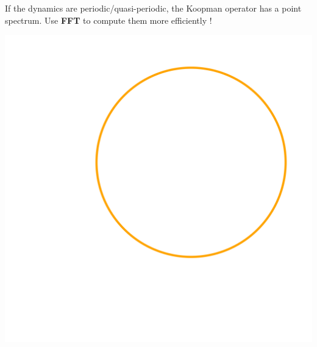 \documentclass[aspectratio=169, usenames, dvipsnames]{beamer}
\begin{document}
\begin{frame}
  \vfill
  \centering
  
  \vfill
\end{frame}




\begin{frame}
  \vfill
  \begin{minipage}{.68\textwidth}
    If the dynamics are periodic/quasi-periodic, the Koopman operator has a point spectrum.
    Use \textbf{FFT} to compute them more efficiently !
  \end{minipage}%
  \hfill
  \begin{minipage}{.28\textwidth}
    \centering
    \includegraphics[width=\textwidth]{oscillator_phase_plane}
  \end{minipage}
  \vfill
\end{frame}
\end{document}
